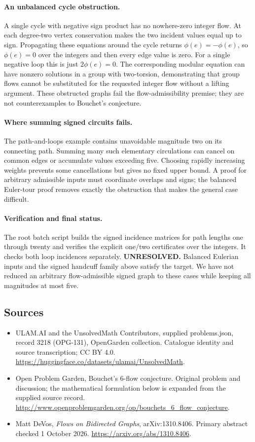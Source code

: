 \documentclass[11pt,a4paper]{article}
\begin{document}
\paragraph{An unbalanced cycle obstruction.}
A single cycle with negative sign product has no nowhere-zero integer
flow. At each degree-two vertex conservation makes the two incident
values equal up to sign. Propagating these equations around the cycle
returns $\phi(e)=-\phi(e)$, so $\phi(e)=0$ over the integers and then
every edge value is zero. For a single negative loop this is just
$2\phi(e)=0$. The corresponding modular equation can have nonzero
solutions in a group with two-torsion, demonstrating that group flows
cannot be substituted for the requested integer flow without a lifting
argument. These obstructed graphs fail the flow-admissibility premise;
they are not counterexamples to Bouchet's conjecture.

\paragraph{Where summing signed circuits fails.}
The path-and-loops example contains unavoidable magnitude two on its
connecting path. Summing many such elementary circulations can cancel
on common edges or accumulate values exceeding five. Choosing rapidly
increasing weights prevents some cancellations but gives no fixed upper
bound. A proof for arbitrary admissible inputs must coordinate overlaps
and signs; the balanced Euler-tour proof removes exactly the obstruction
that makes the general case difficult.

\paragraph{Verification and final status.}
The root batch script builds the signed incidence matrices for path
lengths one through twenty and verifies the explicit one/two certificates
over the integers. It checks both loop incidences separately.
\textbf{UNRESOLVED.} Balanced Eulerian inputs and the signed handcuff
family above satisfy the target. We have not reduced an arbitrary
flow-admissible signed graph to these cases while keeping all magnitudes
at most five.

\subsection{Sources}
\begin{itemize}
\item[S1] ULAM.AI and the UnsolvedMath Contributors, supplied problems.json, record 3218 (OPG-131), OpenGarden collection. Catalogue identity and source transcription; CC BY 4.0.
\url{https://huggingface.co/datasets/ulamai/UnsolvedMath}.
\item[S2] Open Problem Garden, Bouchet's 6-flow conjecture. Original problem and discussion; the mathematical formulation below is expanded from the supplied source record.
\url{http://www.openproblemgarden.org/op/bouchets_6_flow_conjecture}.
\item[R1] Matt DeVos, \emph{Flows on Bidirected Graphs},
arXiv:1310.8406. Primary abstract checked 1 October 2026.
\url{https://arxiv.org/abs/1310.8406}.
\end{itemize}
\end{document}
